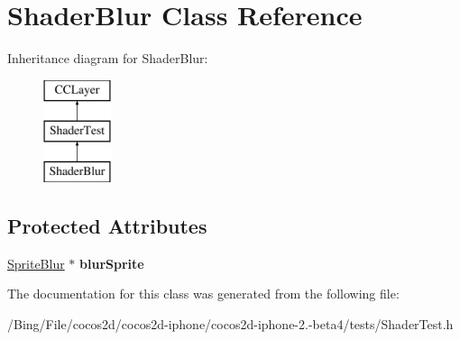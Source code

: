 \hypertarget{interface_shader_blur}{\section{Shader\-Blur Class Reference}
\label{interface_shader_blur}
}
Inheritance diagram for Shader\-Blur\-:\begin{figure}[H]
\begin{center}
\leavevmode
\includegraphics[height=3.000000cm]{interface_shader_blur}
\end{center}
\end{figure}
\subsection*{Protected Attributes}
\begin{DoxyCompactItemize}
\item 
\hypertarget{interface_shader_blur_ab237f5c58b355c3e0bd1e04586ba933b}{\hyperlink{interface_sprite_blur}{Sprite\-Blur} $\ast$ {\bfseries blur\-Sprite}}\label{interface_shader_blur_ab237f5c58b355c3e0bd1e04586ba933b}

\end{DoxyCompactItemize}


The documentation for this class was generated from the following file\-:\begin{DoxyCompactItemize}
\item 
/\-Bing/\-File/cocos2d/cocos2d-\/iphone/cocos2d-\/iphone-\/2.-\/beta4/tests/Shader\-Test.\-h\end{DoxyCompactItemize}
